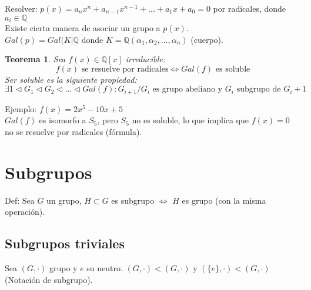\documentclass[11pt]{book}
\newtheorem{thm}{Teorema}[section]
\theoremstyle{definition}
\begin{document}
Resolver: $p(x)=a_nx^n+a_{n-1}x^{n-1}+...+a_1x+a_0=0$ por radicales, donde $a_i\in\mathbb{Q}$\\
Existe cierta manera de asociar un grupo a $p(x)$.\\
$Gal(p)=Gal(K|\mathbb{Q}$ donde $K=\mathbb{Q}(\alpha_1,\alpha_2,...,\alpha_n)$ (cuerpo).\\
\begin{thm}
Sea $f(x)\in \mathbb{Q}[x]$ irreducible:\\
\[
f(x)\textrm{ se resuelve por radicales}\iff Gal(f)\textrm{ es soluble}
\]
Ser soluble es la siguiente propiedad:
\[
\exists 1\triangleleft G_1\triangleleft G_2\triangleleft ...\triangleleft Gal(f):G_{i+1}/G_i\textrm{ es grupo abeliano y } G_i\textrm{ subgrupo de } G_i+1
\]
\end{thm}
Ejemplo: $f(x)=2x^5-10x+5$\\
$Gal(f)$ es isomorfo a $S_5$, pero $S_5$ no es soluble, lo que implica que $f(x)=0$ no se resuelve por radicales (fórmula).\\

\section{Subgrupos}
Def: Sea $G$ un grupo, $H\subset G$ es subgrupo $\iff$ $H$ es grupo (con la misma operación).\\
\subsection{Subgrupos triviales}
Sea $(G,\cdot)$ grupo y $e$ su neutro. $(G,\cdot)<(G,\cdot)$ y $(\{e\},\cdot)<(G,\cdot)$ (Notación de subgrupo).
\end{document}
